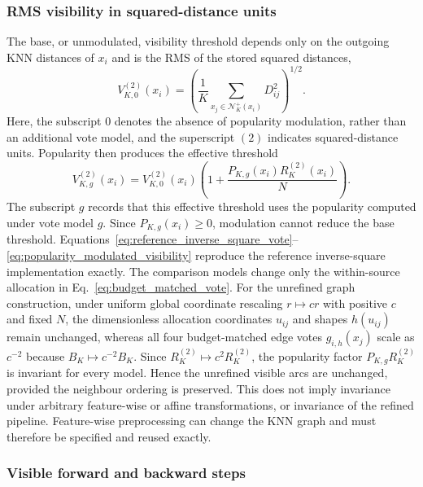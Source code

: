 \documentclass[pdflatex,sn-basic,Numbered]{sn-jnl}
\newcommand{\calN}{\mathcal{N}}
\begin{document}
\subsubsection{RMS visibility in squared-distance units}

The base, or unmodulated, visibility threshold depends only on the outgoing
KNN distances of $x_i$ and is the RMS of the stored squared distances,
\begin{equation}
V_{K,0}^{(2)}(x_i)=
\left(
\frac{1}{K}
\sum_{x_j\in\calN_K^+(x_i)}D_{ij}^{2}
\right)^{1/2}.
\label{eq:rms_visibility_base}
\end{equation}
Here, the subscript $0$ denotes the absence of popularity modulation, rather
than an additional vote model, and the superscript $(2)$ indicates
squared-distance units.
Popularity then produces the effective threshold
\begin{equation}
V_{K,g}^{(2)}(x_i)=V_{K,0}^{(2)}(x_i)
\left(1+\frac{P_{K,g}(x_i)R_K^{(2)}(x_i)}{N}\right).
\label{eq:popularity_modulated_visibility}
\end{equation}
The subscript $g$ records that this effective threshold uses the popularity
computed under vote model $g$.  Since $P_{K,g}(x_i)\geq0$, modulation cannot
reduce the base threshold.
Equations~\eqref{eq:reference_inverse_square_vote}--\eqref{eq:popularity_modulated_visibility} reproduce the reference inverse-square implementation exactly. The comparison models change only the within-source allocation in Eq.~\eqref{eq:budget_matched_vote}. For the unrefined graph construction, under uniform global coordinate rescaling
$r\mapsto cr$ with positive $c$ and fixed $N$, the dimensionless
allocation coordinates $u_{ij}$ and shapes $h(u_{ij})$ remain unchanged,
whereas all four budget-matched edge votes $g_{i,h}(x_j)$ scale as
$c^{-2}$ because $B_K\mapsto c^{-2}B_K$. Since
$R_K^{(2)}\mapsto c^2R_K^{(2)}$, the popularity factor
$P_{K,g}R_K^{(2)}$ is invariant for every model. Hence the unrefined visible
arcs are unchanged, provided the neighbour ordering is preserved. This does not
imply invariance under arbitrary feature-wise or affine transformations, or
invariance of the refined pipeline. Feature-wise preprocessing can change the
KNN graph and must therefore be specified and reused exactly.

\subsubsection{Visible forward and backward steps}
\end{document}
